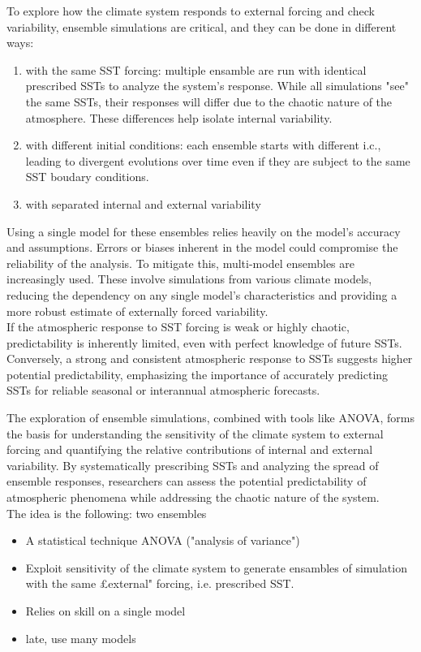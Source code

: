 To explore how the climate system responds to external forcing and check variability, ensemble simulations are critical, and they can be done in different ways: 
\begin{enumerate}
    \item with the same SST forcing: multiple ensamble are run with identical prescribed SSTs to analyze the system's response. While all simulations "see" the same SSTs, their responses will differ due to the chaotic nature of the atmosphere. These differences help isolate internal variability.
    \item with different initial conditions: each ensemble starts with different i.c., leading to divergent evolutions over time even if they are subject to the same SST boudary conditions.
    \item with separated internal and external variability
\end{enumerate}
Using a single model for these ensembles relies heavily on the model's accuracy and assumptions. Errors or biases inherent in the model could compromise the reliability of the analysis.
To mitigate this, multi-model ensembles are increasingly used. These involve simulations from various climate models, reducing the dependency on any single model's characteristics and providing a more robust estimate of externally forced variability. \\

If the atmospheric response to SST forcing is weak or highly chaotic, predictability is inherently limited, even with perfect knowledge of future SSTs.
Conversely, a strong and consistent atmospheric response to SSTs suggests higher potential predictability, emphasizing the importance of accurately predicting SSTs for reliable seasonal or interannual atmospheric forecasts.

The exploration of ensemble simulations, combined with tools like ANOVA, forms the basis for understanding the sensitivity of the climate system to external forcing and quantifying the relative contributions of internal and external variability. By systematically prescribing SSTs and analyzing the spread of ensemble responses, researchers can assess the potential predictability of atmospheric phenomena while addressing the chaotic nature of the system.\\






The idea is the following: two ensembles
\begin{itemize}
    \item A statistical technique ANOVA ("analysis of variance")
    \item Exploit sensitivity of the climate system to generate ensambles of simulation with the same £external" forcing, i.e. prescribed SST. 
    \item Relies on skill on a single model
    \item late, use many models
\end{itemize}


